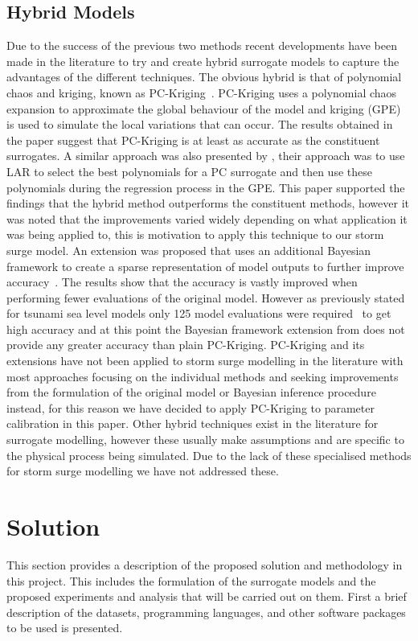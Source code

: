 \documentclass[12pt,a4paper]{article}
\begin{document}
\subsection{Hybrid Models}
\noindent
Due to the success of the previous two methods recent developments have been made in the literature to try and create hybrid surrogate models to capture the advantages of the different techniques. The obvious hybrid is that of polynomial chaos and kriging, known as PC-Kriging~\cite{pckriging}. PC-Kriging uses a polynomial chaos expansion to approximate the global behaviour of the model and kriging (GPE) is used to simulate the local variations that can occur. The results obtained in the paper suggest that PC-Kriging is at least as accurate as the constituent surrogates. A similar approach was also presented by , their approach was to use LAR to select the best polynomials for a PC surrogate and then use these polynomials during the regression process in the GPE. This paper supported the findings that the hybrid method outperforms the constituent methods, however it was noted that the improvements varied widely depending on what application it was being applied to, this is motivation to apply this technique to our storm surge model. An extension was proposed that uses an additional Bayesian framework to create a sparse representation of model outputs to further improve accuracy~\cite{pckrigingext}. The results show that the accuracy is vastly improved when performing fewer evaluations of the original model. However as previously stated for tsunami sea level models only 125 model evaluations were required~\cite{tsunami} to get high accuracy and at this point the Bayesian framework extension from  does not provide any greater accuracy than plain PC-Kriging. PC-Kriging and its extensions have not been applied to storm surge modelling in the literature with most approaches focusing on the individual methods and seeking improvements from the formulation of the original model or Bayesian inference procedure instead, for this reason we have decided to apply PC-Kriging to parameter calibration in this paper. Other hybrid techniques exist in the literature for surrogate modelling, however these usually make assumptions and are specific to the physical process being simulated. Due to the lack of these specialised methods for storm surge modelling we have not addressed these.

\section{Solution} \label{sec:sol}
\noindent
This section provides a description of the proposed solution and methodology in this project. This includes the formulation of the surrogate models and the proposed experiments and analysis that will be carried out on them. First a brief description of the datasets, programming languages, and other software packages to be used is presented.
\end{document}
